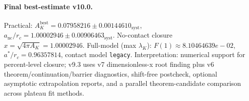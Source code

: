 \paragraph{Final best-estimate v10.0.}
Practical: $A_K^{\mathrm{best}} = 0.07958216 \pm 0.00144610_{\mathrm{syst}}$, $a_{\mathrm{nc}}/r_c = 1.00002946 \pm 0.00906463_{\mathrm{syst}}$.
No-contact closure $x = \sqrt{4\pi A_K} = 1.00002946$.
Full-model (max $\lambda_K$): $F(1) \approx 8.10464639e-02$, $a^*/r_c = 0.96357814$, contact model \texttt{legacy}.
Interpretation: numerical support for percent-level closure; v9.3 uses v7 dimensionless-x root finding plus v6 theorem/continuation/barrier diagnostics, shift-free postcheck, optional asymptotic extrapolation reports, and a parallel theorem-candidate comparison across plateau fit methods.
